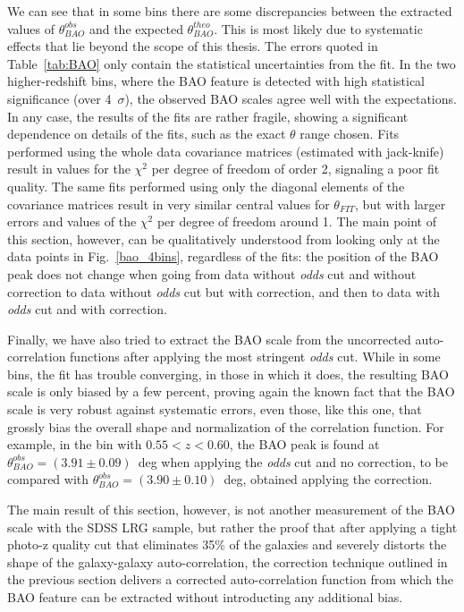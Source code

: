 We can see that in some bins there are some discrepancies between the extracted values of $\theta^{obs}_{BAO}$ and the expected $\theta^{theo}_{BAO}$. This is most likely due to systematic effects that lie beyond the scope of this thesis. The errors quoted in Table~\ref{tab:BAO} only contain the statistical uncertainties from the fit. In the two higher-redshift bins, where the BAO feature is detected with high statistical significance (over 4~$\sigma$), the observed BAO scales agree well with the expectations.  
In any case, the results of the fits are rather fragile, showing a significant dependence on details of the fits, such as the exact $\theta$ range chosen. Fits performed using the whole data covariance matrices (estimated with jack-knife) result in values for the $\chi^2$ per degree of freedom of order 2, signaling a poor fit quality. The same fits performed using only the diagonal elements of the covariance matrices result in very similar central values for $\theta_{FIT}$, but with larger errors and values of the $\chi^2$ per degree of freedom around 1. The main point of this section, however, can be qualitatively understood from looking only at the data points in Fig.~\ref{bao_4bins},  regardless of the fits: the position of the BAO peak does not change when going from data without {\em odds} cut and without correction to data without {\em odds} cut but with correction, and then to data with {\em odds} cut and with correction.

Finally, we have also tried to extract the BAO scale from the uncorrected auto-correlation functions after applying the most stringent {\em odds} cut. While in some bins, the fit has trouble converging, in those in which it does, the resulting BAO scale is only biased by a few percent, proving again the known fact that the BAO scale is very robust against systematic errors, even those, like this one, that grossly bias the overall shape and normalization of the correlation function. For example, in the bin with $0.55 < z < 0.60$, the BAO peak is found at $\theta^{obs}_{BAO} = (3.91 \pm 0.09)$~deg when applying the {\em odds} cut and no correction, to be compared with $\theta^{obs}_{BAO} = (3.90 \pm 0.10)$~deg, obtained applying the correction.

The main result of this section, however, is not another measurement of the BAO scale with the SDSS LRG sample, but rather the proof that after applying a tight photo-z quality cut that eliminates 35\% of the galaxies and severely distorts the shape of the galaxy-galaxy auto-correlation, the correction technique outlined in the previous section delivers a corrected auto-correlation function from which the BAO feature can be extracted without introducting any additional bias.
